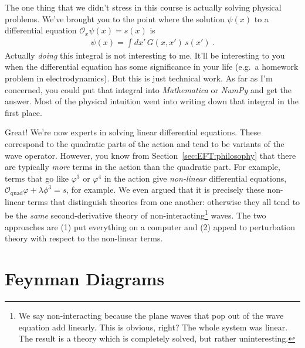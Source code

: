 The one thing that we didn't stress in this course is actually solving physical problems. We've brought you to the point where the solution $\psi(x)$ to a differential equation $\mathcal O_x \psi(x) = s(x)$ is
\begin{align}
	\psi(x) = \int dx'\, G(x,x')\, s(x') \ .
\end{align}
Actually \emph{doing} this integral is not interesting to me. It'll be interesting to you when the differential equation has some significance in your life (e.g.~a homework problem in electrodynamics). But this is just technical work. As far as I'm concerned, you could put that integral into \emph{Mathematica} or \emph{NumPy} and get the answer. Most of the physical intuition went into writing down that integral in the first place.

Great! We're now experts in solving linear differential equations. These correspond to the quadratic parts of the action and tend to be variants of the wave operator. However, you know from Section~\ref{sec:EFT:philosophy} that there are typically \emph{more} terms in the action than the quadratic part. For example, terms that go like $\varphi^3$ or $\varphi^4$ in the action give \emph{non-linear} differential equations, $\mathcal O_\text{quad}\varphi + \lambda \phi^3 = s$, for example. We even argued that it is precisely these non-linear terms that distinguish theories from one another: otherwise they all tend to be the \emph{same} second-derivative theory of non-interacting\footnote{We say non-interacting because the plane waves that pop out of the wave equation add linearly. This is obvious, right? The whole system was linear. The result is a theory which is completely solved, but rather uninteresting.} waves. The two approaches are (1) put everything on a computer and (2) appeal to perturbation theory with respect to the non-linear terms.
 

\section{Feynman Diagrams}

